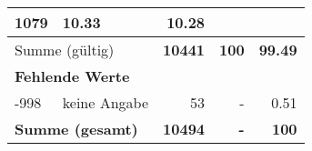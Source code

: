 \begin{longtable}{lXrrr}
       \num{1079} &
       \num[round-mode=places,round-precision=2]{10.33} &
         \num[round-mode=places,round-precision=2]{10.28} \\
     \midrule
     \multicolumn{2}{l}{Summe (gültig)} &
       \textbf{\num{10441}} &
     \textbf{\num{100}} &
       \textbf{\num[round-mode=places,round-precision=2]{99.49}} \\
     \multicolumn{5}{l}{\textbf{Fehlende Werte}}\\
       -998 &
       keine Angabe &
         \num{53} &
        - &
         \num[round-mode=places,round-precision=2]{0.51} \\
     \midrule
     \multicolumn{2}{l}{\textbf{Summe (gesamt)}} &
          \textbf{\num{10494}} &
        \textbf{-} &
        \textbf{\num{100}} \\
     \bottomrule
     \end{longtable}
     
